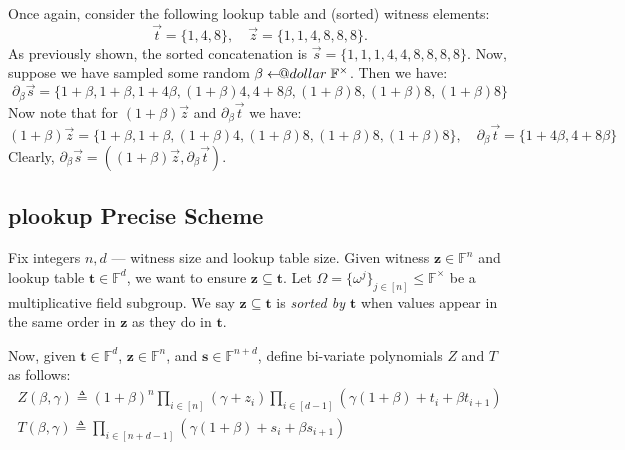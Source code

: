\documentclass{lookup-template}
\makeatletter
\newcommand\leftarrowS{\leftarrow\joinrel\smalldollar}
\newcommand{\smalldollar}{\mathrel{\mathpalette\small@dollar\relax}}
\newcommand{\small@dollar}[2]{%
  \vcenter{\hbox{%
    $#1\textnormal{\fontsize{0.7\dimexpr\f@size pt}{0}\selectfont\$}$%
  }}%
}
\makeatother
\begin{document}
\begin{example}
    Once again, consider the following lookup table and (sorted) witness elements:
    \begin{equation*}
        \vec{t} = \{1,4,8\}, \quad \vec{z} = \{1,1,4,8,8,8\}.
    \end{equation*}
    As previously shown, the sorted concatenation is $\vec{s}=\{1,1,1,4,4,8,8,8,8\}$. Now, suppose 
    we have sampled some random $\beta \leftarrowS \mathbb{F}^{\times}$. Then we have:
    \begin{equation*}
        \partial_{\beta}\vec{s} = \{1+\beta,1+\beta,1+4\beta,(1+\beta)4,4+8\beta,(1+\beta)8,(1+\beta)8,(1+\beta)8\}
    \end{equation*}
    Now note that for $(1+\beta)\vec{z}$ and $\partial_{\beta}\vec{t}$ we have:
    \begin{equation*}
        (1+\beta)\vec{z} = \{1+\beta,1+\beta,(1+\beta)4,(1+\beta)8,(1+\beta)8,(1+\beta)8\}, \quad \partial_{\beta}\vec{t} = \{1+4\beta,4+8\beta\}
    \end{equation*}
    Clearly, $\partial_{\beta}\vec{s} = ((1+\beta)\vec{z},\partial_{\beta}\vec{t})$.
\end{example}

\subsection*{plookup Precise Scheme}

Fix integers $n,d$ --- witness size and lookup table size. Given witness
$\boldsymbol{z} \in \mathbb{F}^n$ and lookup table $\boldsymbol{t} \in
\mathbb{F}^d$, we want to ensure $\boldsymbol{z} \subseteq \boldsymbol{t}$. Let
$\Omega = \{\omega^j\}_{j \in [n]} \leq \mathbb{F}^{\times}$ be a multiplicative
field subgroup. We say $\boldsymbol{z} \subseteq \boldsymbol{t}$ is
\textit{sorted by $\boldsymbol{t}$} when values appear in the same order in
$\boldsymbol{z}$ as they do in $\boldsymbol{t}$. 

Now, given $\boldsymbol{t} \in \mathbb{F}^d$, $\boldsymbol{z} \in \mathbb{F}^n$,
and $\boldsymbol{s} \in \mathbb{F}^{n+d}$, define bi-variate polynomials $Z$ and
$T$ as follows:
\begin{gather*}
    Z(\beta,\gamma) \triangleq (1+\beta)^n \prod_{i \in [n]}(\gamma+z_i)\prod_{i \in [d-1]}(\gamma(1+\beta)+t_i+\beta t_{i+1}) \\
    T(\beta,\gamma) \triangleq \prod_{i \in [n+d-1]} (\gamma(1+\beta)+s_i+\beta s_{i+1})
\end{gather*}
\end{document}
